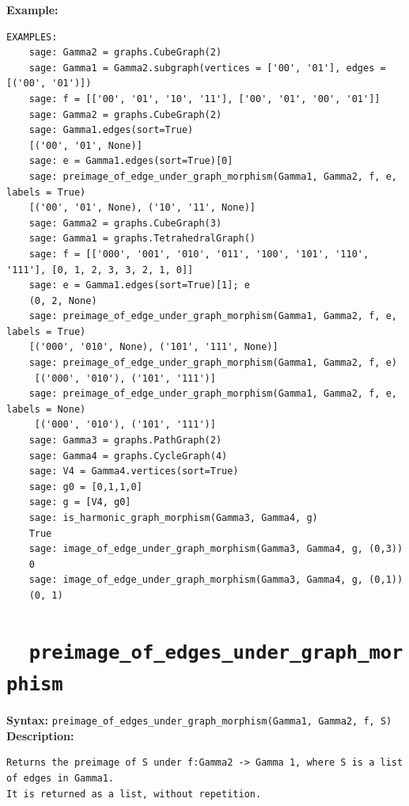 \documentclass{article}
\begin{document}
\noindent
\textbf{Example:}
\begin{verbatim}
EXAMPLES:
    sage: Gamma2 = graphs.CubeGraph(2)
    sage: Gamma1 = Gamma2.subgraph(vertices = ['00', '01'], edges = [('00', '01')])
    sage: f = [['00', '01', '10', '11'], ['00', '01', '00', '01']]
    sage: Gamma2 = graphs.CubeGraph(2)
    sage: Gamma1.edges(sort=True)
    [('00', '01', None)]
    sage: e = Gamma1.edges(sort=True)[0]
    sage: preimage_of_edge_under_graph_morphism(Gamma1, Gamma2, f, e, labels = True)
    [('00', '01', None), ('10', '11', None)]
    sage: Gamma2 = graphs.CubeGraph(3)
    sage: Gamma1 = graphs.TetrahedralGraph()
    sage: f = [['000', '001', '010', '011', '100', '101', '110', '111'], [0, 1, 2, 3, 3, 2, 1, 0]]
    sage: e = Gamma1.edges(sort=True)[1]; e
    (0, 2, None)
    sage: preimage_of_edge_under_graph_morphism(Gamma1, Gamma2, f, e, labels = True)
    [('000', '010', None), ('101', '111', None)]
    sage: preimage_of_edge_under_graph_morphism(Gamma1, Gamma2, f, e)   
     [('000', '010'), ('101', '111')]
    sage: preimage_of_edge_under_graph_morphism(Gamma1, Gamma2, f, e, labels = None) 
     [('000', '010'), ('101', '111')]
    sage: Gamma3 = graphs.PathGraph(2)             
    sage: Gamma4 = graphs.CycleGraph(4)             
    sage: V4 = Gamma4.vertices(sort=True)                   
    sage: g0 = [0,1,1,0]                            
    sage: g = [V4, g0]                             
    sage: is_harmonic_graph_morphism(Gamma3, Gamma4, g) 
    True
    sage: image_of_edge_under_graph_morphism(Gamma3, Gamma4, g, (0,3))
    0
    sage: image_of_edge_under_graph_morphism(Gamma3, Gamma4, g, (0,1))
    (0, 1)
\end{verbatim}

\section{\tt \ \ preimage\_of\_edges\_under\_graph\_morphism}

\textbf{Syntax:} \verb}preimage_of_edges_under_graph_morphism(Gamma1, Gamma2, f, S)}\\

\textbf{Description:}
\begin{verbatim}
Returns the preimage of S under f:Gamma2 -> Gamma 1, where S is a list of edges in Gamma1. 
It is returned as a list, without repetition.

\end{verbatim}
\end{document}
